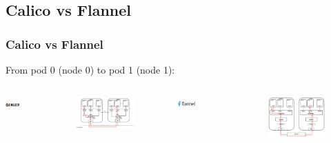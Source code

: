\documentclass{beamer}
\begin{document}
\subsection{Calico vs Flannel}
\begin{frame}
    \frametitle{Calico vs Flannel}
    From pod 0 (node 0) to pod 1 (node 1): \newline \ 

    \begin{columns}
        \vspace{-1.5em}
        \includegraphics[width=0.50\textwidth]{images/other/calico-logo}\newline
        \begin{figure}
            \includegraphics[width=\textwidth, height=0.5\textheight]{images/other/calico_diagram}
        \end{figure}
        \vspace{-1.5em}
        \includegraphics[width=0.35\textwidth]{images/other/flannel-logo}\newline
        \begin{figure}
            \includegraphics[width=\textwidth]{images/other/flannel_diagram}

\end{figure}
\end{columns}
\end{frame}
\end{document}
